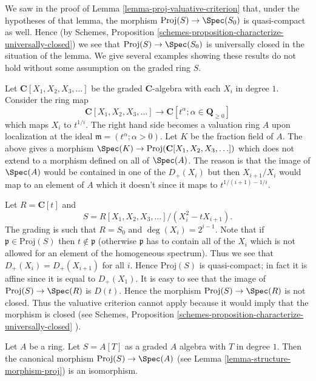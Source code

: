 \noindent
We saw in the proof of Lemma \ref{lemma-proj-valuative-criterion}
that, under the hypotheses of that lemma, the morphism
$\text{Proj}(S) \to \Spec(S_0)$ is quasi-compact as well. Hence (by
Schemes, Proposition \ref{schemes-proposition-characterize-universally-closed})
we see that $\text{Proj}(S) \to \Spec(S_0)$ is universally closed in
the situation of the lemma. We give several examples showing these results
do not hold without some assumption on the graded ring $S$.

\begin{example}
\label{example-not-existence-valuative-big-proj}
Let $\mathbf{C}[X_1, X_2, X_3, \ldots]$ be the graded $\mathbf{C}$-algebra
with each $X_i$ in degree $1$. Consider the ring map
$$
\mathbf{C}[X_1, X_2, X_3, \ldots]
\longrightarrow
\mathbf{C}[t^\alpha ; \alpha \in \mathbf{Q}_{\geq 0}]
$$
which maps $X_i$ to $t^{1/i}$. The right hand side becomes a valuation ring
$A$ upon localization at the ideal $\mathfrak m = (t^\alpha ; \alpha > 0)$.
Let $K$ be the fraction field of $A$. The above gives a morphism
$\Spec(K) \to \text{Proj}(\mathbf{C}[X_1, X_2, X_3, \ldots])$ which does not
extend to a morphism defined on all of $\Spec(A)$.
The reason is that the image of $\Spec(A)$ would be contained
in one of the $D_{+}(X_i)$ but then $X_{i + 1}/X_i$ would map
to an element of $A$ which it doesn't since it maps to
$t^{1/(i + 1) - 1/i}$.
\end{example}

\begin{example}
\label{example-not-existence-valuative-small-proj}
Let $R = \mathbf{C}[t]$ and
$$
S = R[X_1, X_2, X_3, \ldots]/(X_i^2 - tX_{i + 1}).
$$
The grading is such that $R = S_0$ and $\deg(X_i) = 2^{i - 1}$.
Note that if $\mathfrak p \in \text{Proj}(S)$ then
$t \not \in \mathfrak p$ (otherwise $\mathfrak p$ has to contain
all of the $X_i$ which is not allowed for an element of
the homogeneous spectrum). Thus we see that
$D_{+}(X_i) = D_{+}(X_{i + 1})$ for all $i$. Hence
$\text{Proj}(S)$ is quasi-compact; in fact it is affine
since it is equal to $D_{+}(X_1)$. It is easy to see that
the image of $\text{Proj}(S) \to \Spec(R)$ is
$D(t)$. Hence the morphism $\text{Proj}(S) \to \Spec(R)$
is not closed. Thus the valuative criterion cannot apply because
it would imply that the morphism is closed (see
Schemes, Proposition \ref{schemes-proposition-characterize-universally-closed}
).
\end{example}

\begin{example}
\label{example-trivial-proj}
Let $A$ be a ring.
Let $S = A[T]$ as a graded $A$ algebra with $T$ in degree $1$.
Then the canonical morphism $\text{Proj}(S) \to \Spec(A)$
(see Lemma \ref{lemma-structure-morphism-proj})
is an isomorphism.
\end{example}

